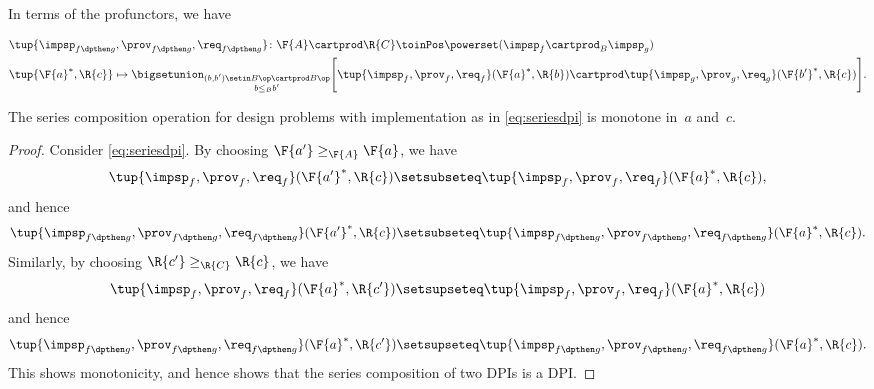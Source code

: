 {\begin{definition}
        In terms of the profunctors, we have
        \begin{widepar}
            \begin{equation}
                \label{eq:seriesdpi}
                \begin{aligned}
                     & \tup{\impsp_{f\dpthen g},\prov_{f\dpthen g},\req_{f\dpthen g}}\colon \F{A}\cartprod \R{C} \toinPos \powerset(\impsp_f \cartprod_B \impsp_g) \\
                     & \tup{\F{a}^*,\R{c}} \mapsto \bigsetunion_{\substack{(b,b') \setin B\op \cartprod B\op \\ b \leq_B b'}} \Bigg[ \tup{\impsp_f,\prov_f,\req_f}(\F{a}^*,\R{b}) \cartprod \tup{\impsp_g,\prov_g,\req_g}(\F{b'}^*,\R{c}) \Bigg].
                \end{aligned}
            \end{equation}
        \end{widepar}
    \end{definition}

    \begin{lemma}
        The series composition operation for design problems with implementation as in \cref{eq:seriesdpi} is monotone in~$a$ and~$c$.
    \end{lemma}
    \begin{proof}
        Consider \cref{eq:seriesdpi}.
        By choosing $\F{a'}\geq_\F{A} \F{a}$, we have
        \begin{equation}
            \tup{\impsp_{f},\prov_{f},\req_{f}}(\F{a'}^*,\R{c})\setsubseteq \tup{\impsp_{f},\prov_{f},\req_{f}}(\F{a}^*,\R{c}),
        \end{equation}
        and hence
        \begin{equation}
            \tup{\impsp_{f\dpthen g},\prov_{f\dpthen g},\req_{f\dpthen g}}(\F{a'}^*,\R{c})\setsubseteq \tup{\impsp_{f\dpthen g},\prov_{f\dpthen g},\req_{f\dpthen g}}(\F{a}^*,\R{c}).
        \end{equation}
        Similarly, by choosing $\R{c'}\geq_{\R{C}} \R{c}$, we have
        \begin{equation}
            \tup{\impsp_{f},\prov_{f},\req_{f}}(\F{a}^*,\R{c'})\setsupseteq \tup{\impsp_{f},\prov_{f},\req_{f}}(\F{a}^*,\R{c})
        \end{equation}
        and hence
        \begin{equation}
            \tup{\impsp_{f\dpthen g},\prov_{f\dpthen g},\req_{f\dpthen g}}(\F{a}^*,\R{c'})\setsupseteq \tup{\impsp_{f\dpthen g},\prov_{f\dpthen g},\req_{f\dpthen g}}(\F{a}^*,\R{c}).
        \end{equation}
        This shows monotonicity, and hence shows that the series composition of two DPIs is a DPI.
    \end{proof}

}
